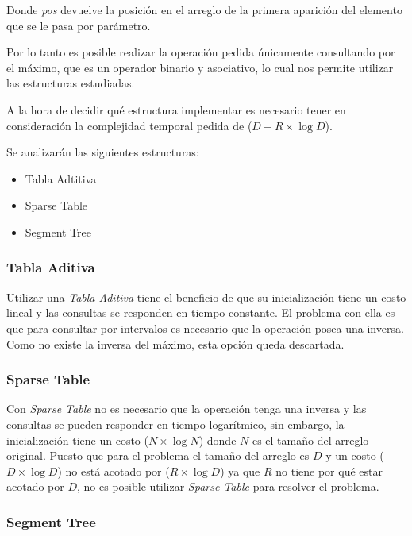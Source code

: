 Donde \emph{pos} devuelve la posición en el arreglo de la primera aparición del
elemento que se le pasa por parámetro.

Por lo tanto es posible realizar la operación pedida únicamente consultando por
el máximo, que es un operador binario y asociativo, lo cual nos permite
utilizar las estructuras estudiadas.

A la hora de decidir qué estructura implementar es necesario tener en
consideración la complejidad temporal pedida de \ord($D + R \times \log{D}$).

Se analizarán las siguientes estructuras:

\begin{itemize}
	\item{Tabla Adtitiva}
	\item{Sparse Table}
	\item{Segment Tree}
\end{itemize}

\subsubsection*{Tabla Aditiva}

Utilizar una \emph{Tabla Aditiva} tiene el beneficio de que su inicialización
tiene un costo lineal y las consultas se responden en tiempo constante. El
problema con ella es que para consultar por intervalos es necesario que la
operación posea una inversa. Como no existe la inversa del máximo, esta opción
queda descartada.

\subsubsection*{Sparse Table}

Con \emph{Sparse Table} no es necesario que la operación tenga una inversa y las
consultas se pueden responder en tiempo logarítmico, sin embargo, la
inicialización tiene un costo \ord($N \times \log N$) donde $N$ es el tamaño del
arreglo original. Puesto que para el problema el tamaño del arreglo es $D$ y un
costo \ord($D \times \log D$) no está acotado por \ord($R \times \log{D}$) ya
que $R$ no tiene por qué estar acotado por $D$, no es posible utilizar
\emph{Sparse Table} para resolver el problema.

\subsubsection*{Segment Tree}

